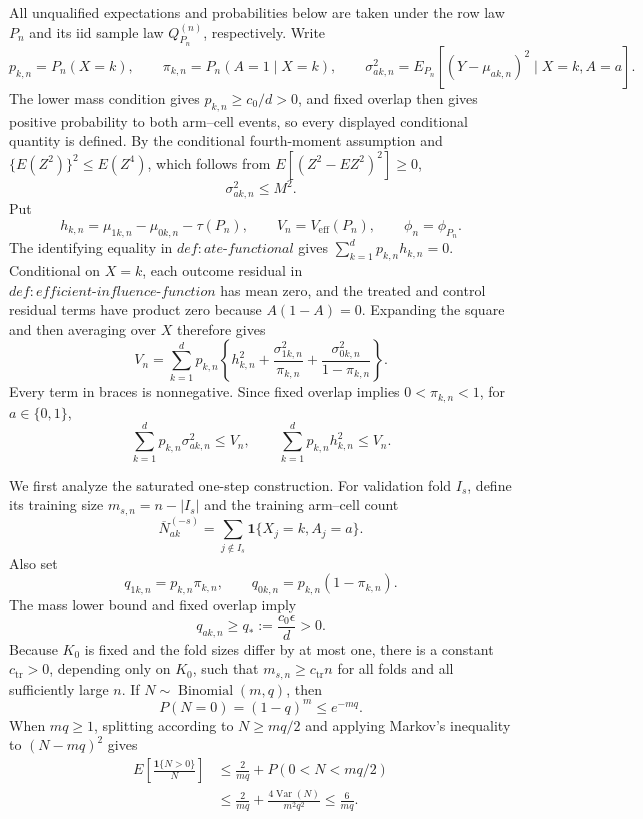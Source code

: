 All unqualified expectations and probabilities below are taken under the row
law \(P_n\) and its iid sample law \(Q_{P_n}^{(n)}\), respectively.  Write
\[
 p_{k,n}=P_n(X=k),\qquad
 \pi_{k,n}=P_n(A=1\mid X=k),\qquad
 \sigma_{ak,n}^2
 =E_{P_n}\!\left[(Y-\mu_{ak,n})^2\mid X=k,A=a\right].
\]
The lower mass condition gives \(p_{k,n}\ge c_0/d>0\), and fixed overlap
then gives positive probability to both arm--cell events, so every displayed
conditional quantity is defined.  By the conditional fourth-moment
assumption and
\(\{E(Z^2)\}^2\le E(Z^4)\), which follows from
\(E[(Z^2-EZ^2)^2]\ge0\),
\[
 \sigma_{ak,n}^2\le M^2.                                           \tag{1}
\]
Put
\[
 h_{k,n}=\mu_{1k,n}-\mu_{0k,n}-\tau(P_n),\qquad
 V_n=V_{\mathrm{eff}}(P_n),\qquad \phi_n=\phi_{P_n}.
\]
The identifying equality in \(def:ate\text{-}functional\) gives
\(\sum_{k=1}^d p_{k,n}h_{k,n}=0\).  Conditional on \(X=k\), each outcome
residual in \(def:efficient\text{-}influence\text{-}function\) has mean zero,
and the treated and control residual terms have product zero because
\(A(1-A)=0\).  Expanding the square and then averaging over \(X\) therefore
gives
\[
 V_n=\sum_{k=1}^d p_{k,n}\left\{
 h_{k,n}^2+\frac{\sigma_{1k,n}^2}{\pi_{k,n}}
              +\frac{\sigma_{0k,n}^2}{1-\pi_{k,n}}
 \right\}.                                                         \tag{2}
\]
Every term in braces is nonnegative.  Since fixed overlap implies
\(0<\pi_{k,n}<1\), for \(a\in\{0,1\}\),
\[
 \sum_{k=1}^d p_{k,n}\sigma_{ak,n}^2\le V_n,
 \qquad
 \sum_{k=1}^d p_{k,n}h_{k,n}^2\le V_n.                             \tag{3}
\]

We first analyze the saturated one-step construction.  For validation fold
\(I_s\), define its training size \(m_{s,n}=n-|I_s|\) and the training
arm--cell count
\[
 \overline N_{ak}^{(-s)}
 =\sum_{j\notin I_s}\mathbf 1\{X_j=k,A_j=a\}.
\]
Also set
\[
 q_{1k,n}=p_{k,n}\pi_{k,n},\qquad
 q_{0k,n}=p_{k,n}(1-\pi_{k,n}).
\]
The mass lower bound and fixed overlap imply
\[
 q_{ak,n}\ge q_*:=\frac{c_0\epsilon}{d}>0.                          \tag{4}
\]
Because \(K_0\) is fixed and the fold sizes differ by at most one, there is
a constant \(c_{\mathrm{tr}}>0\), depending only on \(K_0\), such that
\(m_{s,n}\ge c_{\mathrm{tr}}n\) for all folds and all sufficiently large
\(n\).  If \(N\sim\operatorname{Binomial}(m,q)\), then
\[
 P(N=0)=(1-q)^m\le e^{-mq}.                                        \tag{5}
\]
When \(mq\ge1\), splitting according to \(N\ge mq/2\) and applying
Markov's inequality to \((N-mq)^2\) gives
\[
 \begin{aligned}
 E\!\left[\frac{\mathbf 1\{N>0\}}{N}\right]
 &\le \frac{2}{mq}+P(0<N<mq/2)\\
 &\le \frac{2}{mq}+\frac{4\operatorname{Var}(N)}{m^2q^2}
 \le\frac{6}{mq}.
 \end{aligned}                                                     \tag{6}
\]

